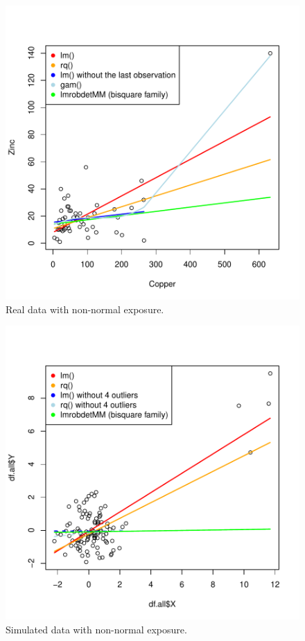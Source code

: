\documentclass[12pt]{article}
\begin{document}
\begin{minipage}{0.475\linewidth}
\begin{figure}[H]
\centering
\includegraphics[width=\textwidth]{./figures/examples-leverage.pdf}
\caption{\label{fig:leverage}Real data with non-normal exposure.}
\end{figure}
\end{minipage}
\begin{minipage}{0.475\linewidth}
\begin{figure}[H]
\centering
\includegraphics[width=\textwidth]{./figures/examplesExtreme-leverage.pdf}
\caption{\label{fig:leverageExtreme}Simulated data with non-normal exposure.}
\end{figure}

\end{minipage}
\end{document}

